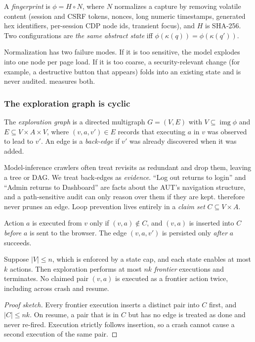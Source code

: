 \begin{definition}
A \emph{fingerprint} is $\phi = H\circ N$, where $N$ normalizes a capture by
removing volatile content (session and CSRF tokens, nonces, long numeric
timestamps, generated hex identifiers, per-session CDP node ids, transient
focus), and $H$ is SHA-256. Two configurations are \emph{the same abstract
state} iff $\phi(\kappa(q))=\phi(\kappa(q'))$.
\end{definition}

Normalization has two failure modes. If it is too sensitive, the model
explodes into one node per page load. If it is too coarse, a security-relevant
change (for example, a destructive button that appears) folds into an existing
state and is never audited.  measures both.

\subsubsection{The exploration graph is cyclic}

\begin{definition}
The \emph{exploration graph} is a directed multigraph $G=(V,E)$ with
$V\subseteq\operatorname{img}\phi$ and $E\subseteq V\times A\times V$, where
$(v,a,v')\in E$ records that executing $a$ in $v$ was observed to lead to $v'$.
An edge is a \emph{back-edge} if $v'$ was already discovered when it was added.
\end{definition}

Model-inference crawlers often treat revisits as redundant and drop them,
leaving a tree or DAG. We treat back-edges as \emph{evidence}. ``Log out
returns to login'' and ``Admin returns to Dashboard'' are facts about the
AUT's navigation structure, and a path-sensitive audit can only reason over
them if they are kept. \sys{} therefore never prunes an edge. Loop prevention
lives entirely in a \emph{claim set} $C\subseteq V\times A$.

\begin{definition}
Action $a$ is executed from $v$ only if $(v,a)\notin C$, and $(v,a)$ is inserted
into $C$ \emph{before} $a$ is sent to the browser. The edge $(v,a,v')$ is
persisted only \emph{after} $a$ succeeds.
\end{definition}

\begin{proposition}
\label{prop:term}
Suppose $|V|\le n$, which is enforced by a state cap, and each state enables
at most $k$ actions. Then exploration performs at most $nk$ \emph{frontier}
executions and terminates. No claimed pair $(v,a)$ is executed as a frontier
action twice, including across crash and resume.
\end{proposition}
\begin{proof}[Proof sketch]
Every frontier execution inserts a distinct pair into $C$ first, and
$|C|\le nk$. On resume, a pair that is in $C$ but has no edge is treated as
done and never re-fired. Execution strictly follows insertion, so a crash
cannot cause a second execution of the same pair.
\end{proof}

